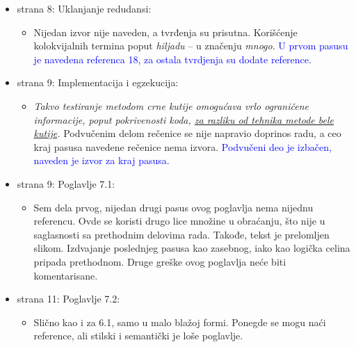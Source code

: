 \documentclass[a4paper]{report}
\newcommand{\odgovor}[1]{\textcolor{blue}{#1}}
\begin{document}
\begin{itemize}
\item strana 8: Uklanjanje redudansi:
  \begin{itemize}
  \item Nijedan izvor nije naveden, a tvrđenja su prisutna. Korišćenje kolokvijalnih termina poput {\em{hiljadu}} -- u značenju {\em{mnogo}}. \odgovor{U prvom pasusu je navedena referenca 18, za ostala tvrdjenja su dodate reference.}
  \end{itemize}
\end{itemize}

\begin{itemize}
\item strana 9: Implementacija i egzekucija:
  \begin{itemize}
  \item {\em{Takvo testiranje metodom crne kutije omogućava vrlo
      ograničene informacije, poput pokrivenosti koda, {\underline{za razliku od tehnika metode bele kutije}}.}} Podvučenim delom rečenice se nije napravio doprinos radu, a ceo kraj pasusa navedene rečenice nema izvora. \odgovor{Podvučeni deo je izbačen, naveden je izvor za kraj pasusa.}
  \end{itemize}
\end{itemize}


\begin{itemize}
\item strana 9: Poglavlje 7.1:
  \begin{itemize}
  \item Sem dela prvog, nijedan drugi pasus ovog poglavlja nema nijednu referencu. Ovde se koristi drugo lice množine u obraćanju, što nije u saglasnosti sa prethodnim delovima rada. Takođe, tekst je prelomljen slikom. Izdvajanje poslednjeg pasusa kao zasebnog, iako kao logička celina pripada prethodnom. Druge greške ovog poglavlja neće biti komentarisane.
  \end{itemize}
\end{itemize}


\begin{itemize}
\item strana 11: Poglavlje 7.2:
  \begin{itemize}
  \item Slično kao i za 6.1, samo u malo blažoj formi. Ponegde se mogu naći reference, ali stilski i semantički je loše poglavlje.
  \end{itemize}
\end{itemize}
\end{document}

